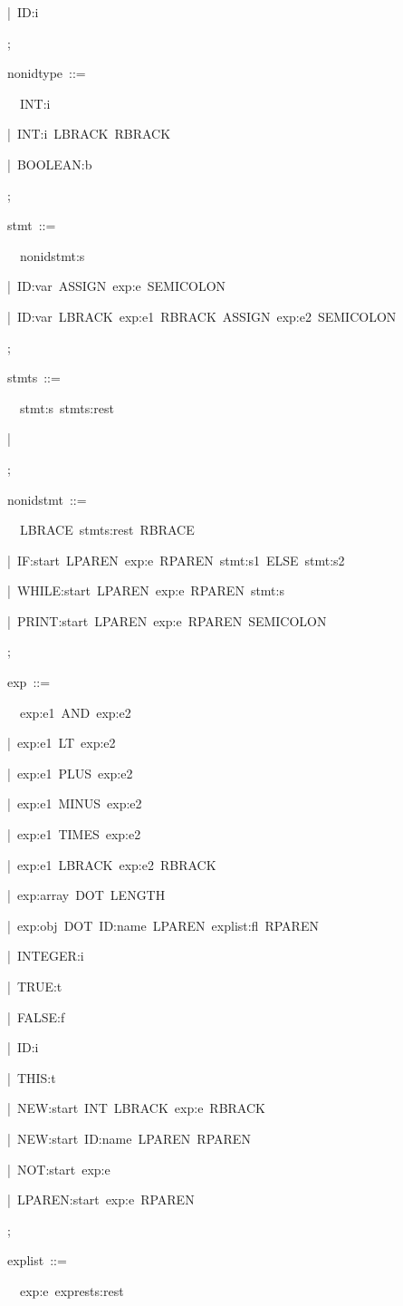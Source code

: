 \documentclass[12pt,english,twoside]{report}
\newenvironment{codeblock}
{\begin{list}{}{
\setlength{\rightmargin}{\leftmargin}
\setlength{\listparindent}{0pt}%
\raggedright
\setlength{\itemsep}{0pt}
\setlength{\parsep}{0pt}
\normalfont\ttfamily}%
 \item[]}
{\end{list}}
\begin{document}
\begin{codeblock}
\begin{codeblock}
\begin{codeblock}
|~ID:i

;
\end{codeblock}
nonidtype~::=
\begin{codeblock}
~~INT:i~

|~INT:i~LBRACK~RBRACK~

|~BOOLEAN:b~

;
\end{codeblock}
stmt~::=
\begin{codeblock}
~~nonidstmt:s

|~ID:var~ASSIGN~exp:e~SEMICOLON

|~ID:var~LBRACK~exp:e1~RBRACK~ASSIGN~exp:e2~SEMICOLON

;
\end{codeblock}
stmts~::=
\begin{codeblock}
~~stmt:s~stmts:rest

|~

;
\end{codeblock}
nonidstmt~::=
\begin{codeblock}
~~LBRACE~stmts:rest~RBRACE

|~IF:start~LPAREN~exp:e~RPAREN~stmt:s1~ELSE~stmt:s2

|~WHILE:start~LPAREN~exp:e~RPAREN~stmt:s

|~PRINT:start~LPAREN~exp:e~RPAREN~SEMICOLON

;
\end{codeblock}
exp~::=
\begin{codeblock}
~~exp:e1~AND~exp:e2

|~exp:e1~LT~exp:e2

|~exp:e1~PLUS~exp:e2

|~exp:e1~MINUS~exp:e2

|~exp:e1~TIMES~exp:e2

|~exp:e1~LBRACK~exp:e2~RBRACK

|~exp:array~DOT~LENGTH

|~exp:obj~DOT~ID:name~LPAREN~explist:fl~RPAREN

|~INTEGER:i

|~TRUE:t

|~FALSE:f

|~ID:i

|~THIS:t

|~NEW:start~INT~LBRACK~exp:e~RBRACK

|~NEW:start~ID:name~LPAREN~RPAREN

|~NOT:start~exp:e

|~LPAREN:start~exp:e~RPAREN

;
\end{codeblock}
explist~::=
\begin{codeblock}
~~exp:e~exprests:rest~


\end{codeblock}
\end{codeblock}
\end{codeblock}
\end{document}
